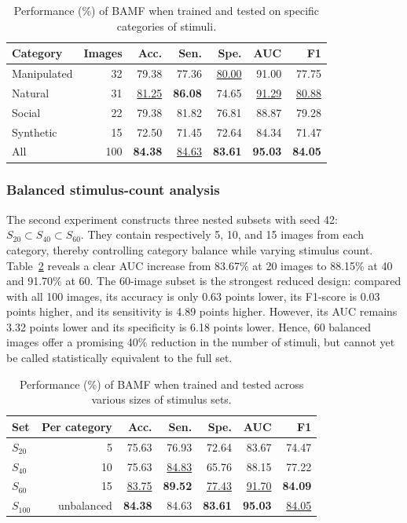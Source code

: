 \documentclass[conference,a4paper]{IEEEtran}
\begin{document}
\begin{table}[t]
\caption{Performance (\%) of BAMF when trained and tested on specific categories of stimuli.}
\label{tab:category_results}
\centering
\small
\setlength{\tabcolsep}{5.2pt}
\begin{tabular}{@{}lrrrrrr@{}}
\toprule
Category & Images & Acc. & Sen. & Spe. & AUC & F1 \\
\midrule
Manipulated & 32 & 79.38 & 77.36 & \underline{80.00} & 91.00 & 77.75 \\
Natural & 31 & \underline{81.25} & \textbf{86.08} & 74.65 & \underline{91.29} & \underline{80.88} \\
Social & 22 & 79.38 & 81.82 & 76.81 & 88.87 & 79.28 \\
Synthetic & 15 & 72.50 & 71.45 & 72.64 & 84.34 & 71.47 \\
All & 100 & \textbf{84.38} & \underline{84.63} & \textbf{83.61} & \textbf{95.03} & \textbf{84.05} \\
\bottomrule
\end{tabular}
\end{table}


\subsubsection{Balanced stimulus-count analysis}
The second experiment constructs three nested subsets with seed 42: $S_{20}\subset S_{40}\subset S_{60}$. They contain respectively 5, 10, and 15 images from each category, thereby controlling category balance while varying stimulus count. Table~\ref{tab:stimulus_count} reveals a clear AUC increase from 83.67\% at 20 images to 88.15\% at 40 and 91.70\% at 60. The 60-image subset is the strongest reduced design: compared with all 100 images, its accuracy is only 0.63 points lower, its F1-score is 0.03 points higher, and its sensitivity is 4.89 points higher. However, its AUC remains 3.32 points lower and its specificity is 6.18 points lower. Hence, 60 balanced images offer a promising 40\% reduction in the number of stimuli, but cannot yet be called statistically equivalent to the full set.

\begin{table}[t]
\caption{Performance (\%) of BAMF when trained and tested across various sizes of stimulus sets.}
\label{tab:stimulus_count}
\centering
\small
\setlength{\tabcolsep}{5.2pt}
\begin{tabular}{lrrrrrr}
\toprule
Set & Per category & Acc. & Sen. & Spe. & AUC & F1 \\
\midrule
$S_{20}$ & 5 & 75.63 & 76.93 & 72.64 & 83.67 & 74.47 \\
$S_{40}$ & 10 & 75.63 & \underline{84.83} & 65.76 & 88.15 & 77.22 \\
$S_{60}$ & 15 & \underline{83.75} & \textbf{89.52} & \underline{77.43} & \underline{91.70} & \textbf{84.09} \\
$S_{100}$ & unbalanced & \textbf{84.38} & 84.63 & \textbf{83.61} & \textbf{95.03} & \underline{84.05} \\
\bottomrule
\end{tabular}
\end{table}
\end{document}
